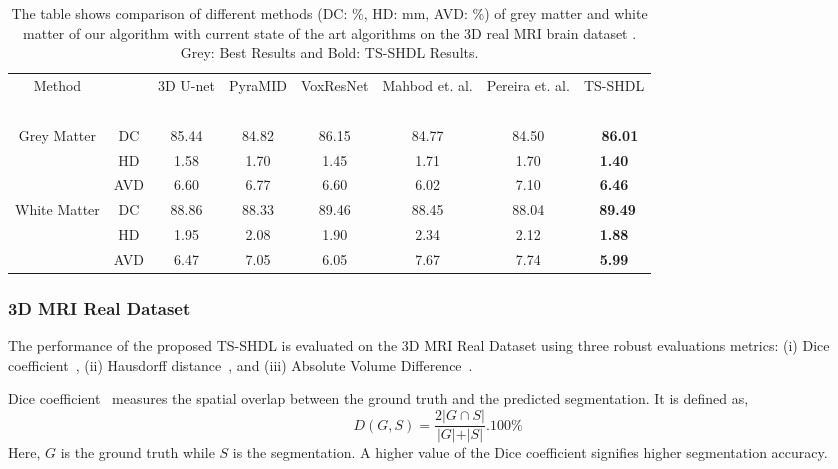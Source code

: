\documentclass[10pt,twocolumn,letterpaper]{article}
\begin{document}
\begin{table*}[!t]
	\centering
	\caption{The table shows comparison of different methods (DC: \%, HD: mm, AVD: \%) of grey matter and white matter of our algorithm with current state of the art algorithms on the 3D real MRI brain dataset \cite{mendrik2015mrbrains}. Grey: Best Results and Bold: TS-SHDL Results.}
	
	\begin{tabular}{|cc||c|c|c|c|c|c|} 
		\hline
		\multicolumn{1}{|c}{\multirow{2}{*}{Method}}& &  3D U-net & PyraMID & VoxResNet & Mahbod et. al.  & Pereira et. al.& TS-SHDL\\
		&&~\cite{cciccek20163d}&~\cite{stollenga2015parallel}&\cite{chen2016voxresnet}&\cite{mahbod2016structural}&~\cite{pereira2016automatic}& \\
		
		\hline\hline
		
		\multirow{3}{*}{Grey Matter}&DC&85.44&84.82&\cellcolor{gray!50}86.15&84.77&84.50&~ \textbf{86.01}\\
		&HD&1.58&1.70&1.45&1.71&1.70& \cellcolor{gray!50}\textbf{1.40} \\
		&AVD&6.60&6.77&6.60&6.02&7.10& \cellcolor{gray!50}\textbf{6.46} \\
		\hline
		\multirow{3}{*}{White Matter}&DC&88.86&88.33&89.46&88.45&88.04&~\cellcolor{gray!50}\textbf{89.49}\\
		&HD&1.95&2.08&1.90&2.34&2.12& \cellcolor{gray!50}\textbf{1.88}\\
		&AVD&6.47&7.05&6.05&7.67&7.74&\cellcolor{gray!50}\textbf{5.99} \\
		\hline
	\end{tabular}
	\label{table:2}
\end{table*}

\subsubsection{3D MRI Real Dataset}
The performance of the proposed TS-SHDL is evaluated on the 3D MRI Real Dataset \cite{mendrik2015mrbrains} using three robust evaluations metrics: (i) Dice coefficient~\cite{cciccek20163d}, (ii) Hausdorff distance~\cite{cciccek20163d}, and (iii) Absolute Volume Difference~\cite{cciccek20163d}.

Dice coefficient~\cite{cciccek20163d} measures the spatial overlap between the ground truth and the predicted segmentation. It is defined as, 
\begin{equation}
D(G,S)=\frac{2\vert G \cap S \vert }{\vert G \vert + \vert S \vert}. 100\%
\end{equation}
Here, $G$ is the ground truth while $S$ is the segmentation. A higher value of the Dice coefficient signifies higher segmentation accuracy.
\end{document}
